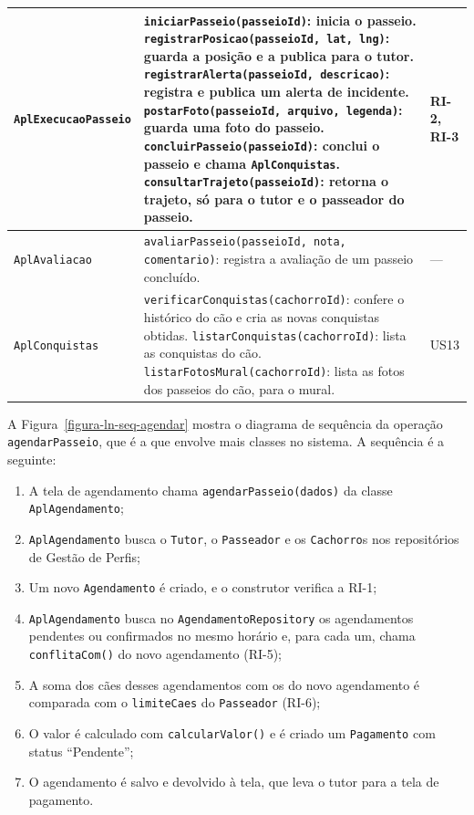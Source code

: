 \begin{footnotesize}
\begin{longtable}{|p{3.4cm}|p{7.6cm}|p{2.4cm}|}
	\texttt{AplExecucaoPasseio} & \texttt{iniciarPasseio(passeioId)}: inicia o passeio. \newline
	\texttt{registrarPosicao(passeioId, lat, lng)}: guarda a posição e a publica para o tutor. \newline
	\texttt{registrarAlerta(passeioId, descricao)}: registra e publica um alerta de incidente. \newline
	\texttt{postarFoto(passeioId, arquivo, legenda)}: guarda uma foto do passeio. \newline
	\texttt{concluirPasseio(passeioId)}: conclui o passeio e chama \texttt{AplConquistas}. \newline
	\texttt{consultarTrajeto(passeioId)}: retorna o trajeto, só para o tutor e o passeador do passeio. & RI-2, RI-3 \\\hline

	\texttt{AplAvaliacao} & \texttt{avaliarPasseio(passeioId, nota, comentario)}: registra a avaliação de um passeio concluído. & --- \\\hline

	\texttt{AplConquistas} & \texttt{verificarConquistas(cachorroId)}: confere o histórico do cão e cria as novas conquistas obtidas. \newline
	\texttt{listarConquistas(cachorroId)}: lista as conquistas do cão. \newline
	\texttt{listarFotosMural(cachorroId)}: lista as fotos dos passeios do cão, para o mural. & US13 \\\hline
\end{longtable}
\end{footnotesize}

A Figura~\ref{figura-ln-seq-agendar} mostra o diagrama de sequência da operação \texttt{agendarPasseio}, que é a que envolve mais classes no sistema. A sequência é a seguinte:

\begin{enumerate}
	\item A tela de agendamento chama \texttt{agendarPasseio(dados)} da classe \texttt{AplAgendamento};
	\item \texttt{AplAgendamento} busca o \texttt{Tutor}, o \texttt{Passeador} e os \texttt{Cachorro}s nos repositórios de Gestão de Perfis;
	\item Um novo \texttt{Agendamento} é criado, e o construtor verifica a RI-1;
	\item \texttt{AplAgendamento} busca no \texttt{AgendamentoRepository} os agendamentos pendentes ou confirmados no mesmo horário e, para cada um, chama \texttt{conflitaCom()} do novo agendamento (RI-5);
	\item A soma dos cães desses agendamentos com os do novo agendamento é comparada com o \texttt{limiteCaes} do \texttt{Passeador} (RI-6);
	\item O valor é calculado com \texttt{calcularValor()} e é criado um \texttt{Pagamento} com status ``Pendente'';
	\item O agendamento é salvo e devolvido à tela, que leva o tutor para a tela de pagamento.
\end{enumerate}

